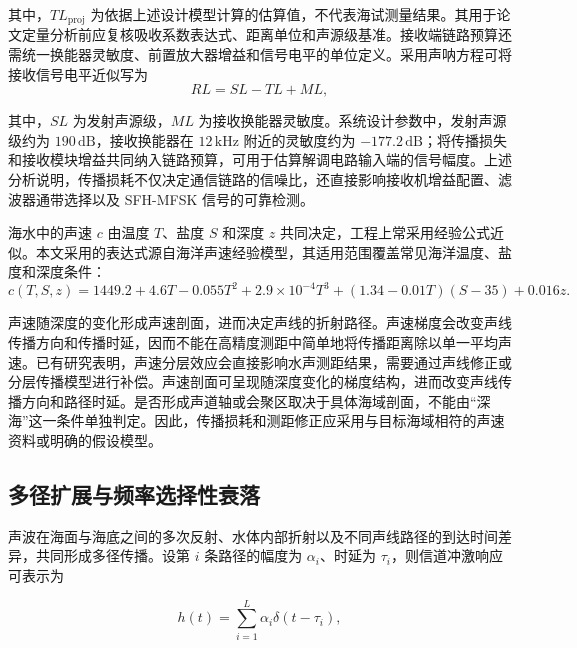 其中，$TL_{\mathrm{proj}}$ 为依据上述设计模型计算的估算值，不代表海试测量结果。其用于论文定量分析前应复核吸收系数表达式、距离单位和声源级基准。接收端链路预算还需统一换能器灵敏度、前置放大器增益和信号电平的单位定义。采用声呐方程可将接收信号电平近似写为
\begin{equation}
  RL = SL - TL + ML,
  \label{eq:received_level}
\end{equation}

其中，$SL$ 为发射声源级，$ML$ 为接收换能器灵敏度。系统设计参数中，发射声源级约为 $190\,\mathrm{dB}$，接收换能器在 $12\,\mathrm{kHz}$ 附近的灵敏度约为 $-177.2\,\mathrm{dB}$；将传播损失和接收模块增益共同纳入链路预算，可用于估算解调电路输入端的信号幅度。上述分析说明，传播损耗不仅决定通信链路的信噪比，还直接影响接收机增益配置、滤波器通带选择以及 SFH-MFSK 信号的可靠检测。

海水中的声速 $c$ 由温度 $T$、盐度 $S$ 和深度 $z$ 共同决定，工程上常采用经验公式近似。本文采用的表达式源自海洋声速经验模型，其适用范围覆盖常见海洋温度、盐度和深度条件\cite{mackenzieNineTermEquationSound1981}：
\begin{equation}
  c(T,S,z) = 1449.2 + 4.6T - 0.055T^{2} + 2.9\times10^{-4}T^{3} + (1.34-0.01T)(S-35) + 0.016z.
  \label{eq:sound_speed}
\end{equation}

声速随深度的变化形成声速剖面，进而决定声线的折射路径。声速梯度会改变声线传播方向和传播时延，因而不能在高精度测距中简单地将传播距离除以单一平均声速。已有研究表明，声速分层效应会直接影响水声测距结果，需要通过声线修正或分层传播模型进行补偿\cite{bergerStratificationEffectCompensation2008,sunRelationshipPropagationTime2019}。声速剖面可呈现随深度变化的梯度结构，进而改变声线传播方向和路径时延。是否形成声道轴或会聚区取决于具体海域剖面，不能由“深海”这一条件单独判定\cite{hovemRayTraceModeling2013}。因此，传播损耗和测距修正应采用与目标海域相符的声速资料或明确的假设模型。

\subsection{多径扩展与频率选择性衰落}

声波在海面与海底之间的多次反射、水体内部折射以及不同声线路径的到达时间差异，共同形成多径传播。设第 $i$ 条路径的幅度为 $\alpha_i$、时延为 $\tau_i$，则信道冲激响应可表示为

\begin{equation}
  h(t) = \sum_{i=1}^{L} \alpha_i \delta(t-\tau_i),
  \label{eq:channel_ir}
\end{equation}

